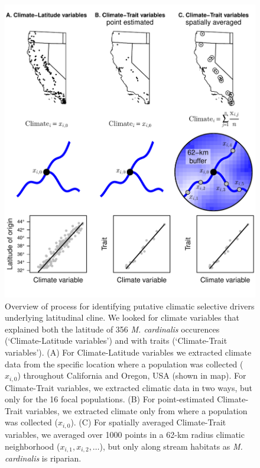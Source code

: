 \documentclass[11pt, oneside]{article}
\begin{document}

\begin{figure}[h!]
	\centerline{\includegraphics[width=1\textwidth]{Figures/Figure_VarSelectBase.pdf}}
	\fontsize{10}{12}
	\selectfont
	\caption[Climatic variable selection]{Overview of process for identifying putative climatic selective drivers underlying latitudinal cline. We looked for climate variables that explained both the latitude of 356 \textit{M. cardinalis} occurences (`Climate-Latitude variables') and with traits (`Climate-Trait variables'). (A) For Climate-Latitude variables we extracted climate data from the specific location where a population was collected ($x_{i,0}$) throughout California and Oregon, USA (shown in map). For Climate-Trait variables, we extracted climatic data in two ways, but only for the 16 focal populations. (B) For point-estimated Climate-Trait variables, we extracted climate only from where a population was collected ($x_{i,0}$). (C) For spatially averaged Climate-Trait variables, we averaged over 1000 points in a 62-km radius climatic neighborhood ($x_{i,1}, x_{i,2}, \dots$), but only along stream habitats as \textit{M. cardinalis} is riparian.}
	\label{fig:Fig_VarSelect}
\end{figure}
\end{document}
